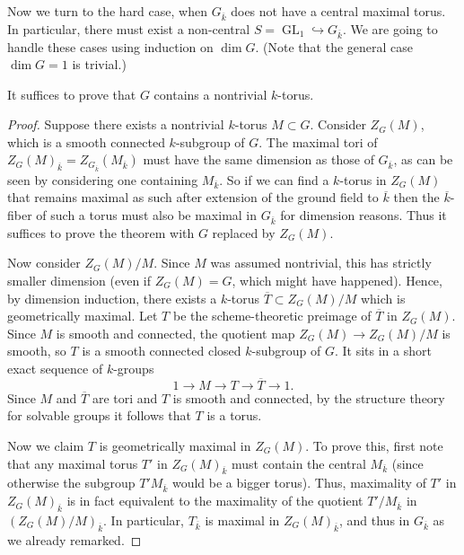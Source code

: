 \documentclass[10pt]{article}
\renewcommand{\(}{\left(}
\renewcommand{\)}{\right)}
\numberwithin{thm}{subsection}
\begin{document}
Now we turn to the hard case, when $G_{\overline{k}}$ does not have a central maximal torus.
In particular, there must exist a non-central 
$S=\operatorname{GL}_1\hookrightarrow G_{\overline{k}}$.  We are going to handle
these cases using induction on $\dim G$.  (Note that the general case $\dim G = 1$ is
trivial.) 

\begin{lemma}\label{2.2} It suffices to prove that $G$ contains a nontrivial $k$-torus.
\end{lemma}

\begin{proof}
Suppose there exists a nontrivial $k$-torus $M\subset G$.
Consider $Z_G(M)$, which is a smooth connected $k$-subgroup of $G$.
The maximal tori of $Z_G(M)_{\overline{k}}=Z_{G_{\overline{k}}}(M_{\overline{k}})$
must have the same dimension as those of $G_{\overline{k}}$, as can be seen by considering
one containing $M_{\overline{k}}$.
So if we can find a $k$-torus in $Z_G(M)$ that remains maximal as such after extension of the
ground field to 
$\overline{k}$ then the $\overline{k}$-fiber of
such a torus must also be maximal in $G_{\overline{k}}$ for dimension reasons.
Thus it suffices to prove the theorem with $G$ replaced by $Z_G(M)$.

Now consider $Z_G(M)/M$. Since $M$ was assumed nontrivial,
this has strictly smaller dimension (even if $Z_G(M) = G$, which might have happened).
Hence, by dimension induction, there exists a $k$-torus $\overline{T}\subset Z_G(M)/M$ 
which is geometrically maximal.
Let $T$ be the scheme-theoretic preimage of $\overline{T}$ in $Z_G(M)$.
Since $M$ is smooth and connected, the quotient map $Z_G(M)\rightarrow Z_G(M)/M$ is smooth,
so $T$ is a smooth connected closed $k$-subgroup of $G$.
It sits in a short exact sequence of $k$-groups 
\[1\rightarrow M\rightarrow T\rightarrow \overline{T}\rightarrow 1.\]
Since $M$ and $\overline{T}$ are tori and $T$ is smooth and connected,
by the structure theory for solvable groups it follows that $T$ is a torus.

Now we claim $T$ is geometrically maximal
in $Z_G(M)$.  To prove this, first note that 
any maximal torus $T'$ in $Z_G(M)_{\overline{k}}$ must
contain the central $M_{\overline{k}}$ (since otherwise the subgroup
$T'M_{\overline{k}}$ would be a bigger torus).
Thus, maximality of $T'$ in $Z_G(M)_{\overline{k}}$
is in fact equivalent to the maximality
of the quotient $T'/M_{\overline{k}}$
in $(Z_G(M)/M)_{\overline{k}}$.
In particular, $T_{\overline{k}}$ is maximal in $Z_G(M)_{\overline{k}}$,
and thus in $G_{\overline{k}}$ as we already remarked.
\end{proof}
\end{document}
